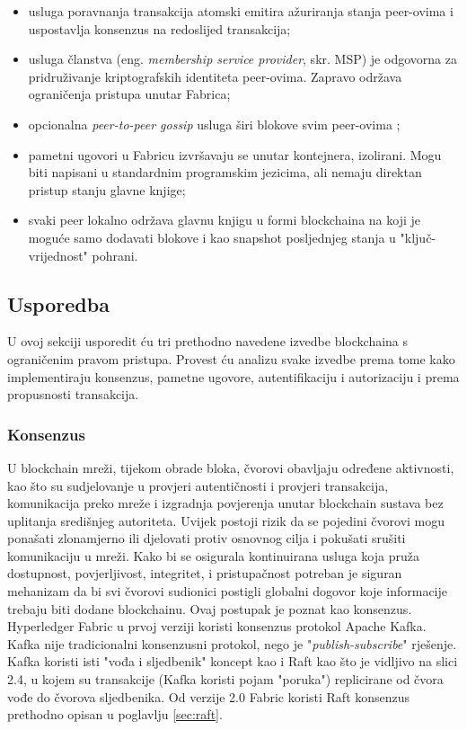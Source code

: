 \documentclass[times, utf8, diplomski]{fer}
\begin{document}
\begin{itemize}

\item usluga poravnanja transakcija atomski emitira ažuriranja stanja peer-ovima i uspostavlja konsenzus na redoslijed transakcija;

\item usluga članstva (eng.  \textit{membership service provider}, skr. MSP) je odgovorna za pridruživanje kriptografskih identiteta peer-ovima. Zapravo održava ograničenja pristupa unutar Fabrica;

\item opcionalna \textit{peer-to-peer gossip} usluga širi blokove svim peer-ovima \cite{gossip-protocol};

\item pametni ugovori u Fabricu izvršavaju se unutar kontejnera, izolirani. Mogu biti napisani u standardnim programskim jezicima, ali nemaju direktan pristup stanju glavne knjige;

\item svaki peer lokalno održava glavnu knjigu u formi blockchaina na koji je moguće samo dodavati blokove i kao snapshot posljednjeg stanja u "ključ-vrijednost" pohrani.

\end{itemize}

\subsection{Usporedba}

U ovoj sekciji usporedit ću tri prethodno navedene izvedbe blockchaina s ograničenim pravom pristupa. Provest ću analizu svake izvedbe prema tome kako implementiraju konsenzus, pametne ugovore, autentifikaciju i autorizaciju i prema propusnosti transakcija.

\subsubsection{Konsenzus}

U blockchain mreži, tijekom obrade bloka, čvorovi obavljaju određene aktivnosti, kao što su sudjelovanje u provjeri autentičnosti i provjeri transakcija, komunikacija preko mreže i izgradnja povjerenja unutar blockchain sustava bez uplitanja središnjeg autoriteta. Uvijek postoji rizik da se pojedini čvorovi mogu ponašati zlonamjerno ili djelovati protiv osnovnog cilja i pokušati srušiti komunikaciju u mreži. Kako bi se osigurala kontinuirana usluga koja pruža dostupnost, povjerljivost, integritet, i pristupačnost potreban je siguran mehanizam da bi svi čvorovi sudionici postigli globalni dogovor koje informacije trebaju biti dodane blockchainu. Ovaj postupak je poznat kao konsenzus.
Hyperledger Fabric u prvoj verziji koristi konsenzus protokol Apache Kafka. Kafka nije tradicionalni konsenzusni protokol, nego je "\textit{publish-subscribe}" rješenje. Kafka koristi isti "vođa i sljedbenik" koncept kao i Raft kao što je vidljivo na slici 2.4, u kojem su transakcije (Kafka koristi pojam "poruka") replicirane od čvora vođe do čvorova sljedbenika. Od verzije 2.0 Fabric koristi Raft konsenzus prethodno opisan u poglavlju \ref{sec:raft}. 
\end{document}
